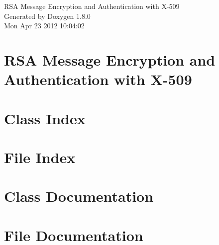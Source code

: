 \documentclass{book}
\begin{document}
\hypersetup{pageanchor=false,citecolor=blue}
\begin{titlepage}
\vspace*{7cm}
\begin{center}
{\Large R\-S\-A Message Encryption and Authentication with X-\/509 }\\
\vspace*{1cm}
{\large Generated by Doxygen 1.8.0}\\
\vspace*{0.5cm}
{\small Mon Apr 23 2012 10:04:02}\\
\end{center}
\end{titlepage}
\clearemptydoublepage
{}
\tableofcontents
\clearemptydoublepage
{}
\hypersetup{pageanchor=true,citecolor=blue}
\chapter{R\-S\-A Message Encryption and Authentication with X-\/509}
\label{index}\hypertarget{index}{}
\chapter{Class Index}

\chapter{File Index}

\chapter{Class Documentation}






\chapter{File Documentation}









\printindex
\end{document}
